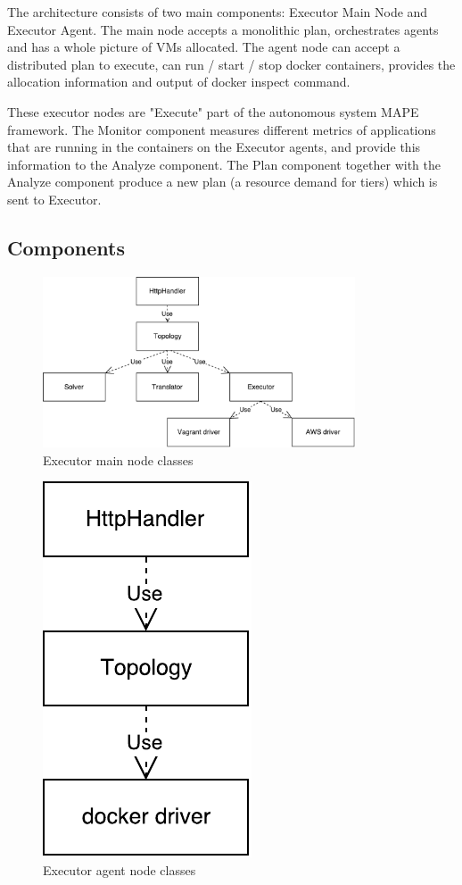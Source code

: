 The architecture consists of two main components: Executor Main Node and Executor Agent. The main node accepts a monolithic plan, orchestrates agents 
and has a whole picture of VMs allocated. The agent node can accept a distributed plan to execute, can run / start / stop docker containers, provides the allocation information and output of docker inspect command.

These executor nodes are "Execute" part of the autonomous system MAPE framework. The Monitor component measures different metrics of applications that are
running in the containers on the Executor agents, and provide this information to the Analyze component. The Plan component together with the Analyze component produce a new plan (a resource demand for tiers) which is sent to Executor.

\clearpage
\subsection{Components}
\begin{figure}[ht]
  \centering
    \includegraphics[width=350px,natwidth=553,natheight=303]{./pictures/main-classes}
    \caption{Executor main node classes}
\end{figure}

\begin{figure}[ht]
  \centering
    \includegraphics[natwidth=113,natheight=203]{./pictures/agent-classes}
    \caption{Executor agent node classes}
\end{figure}